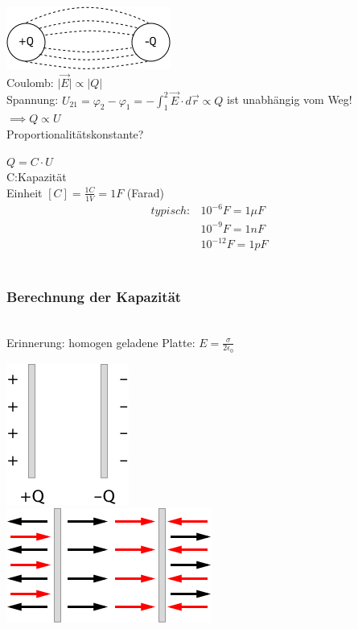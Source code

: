 \documentclass[11pt]{article}
\begin{document}
\includegraphics{skizzen/14/14_8B4}\\

Coulomb: $\vert\vec{E}\vert\propto\vert Q\vert$\\
Spannung: $ U_{21}=\varphi_2-\varphi_1 = -\displaystyle\int_{1}^{2} \vec{E}\cdot d\vec{r}\propto Q $ ist unabhängig vom Weg!\\

$ \implies Q\propto U $\\

Proportionalitätskonstante?

$\boxed{Q=C\cdot U}$\\

C:Kapazität\\
Einheit $[C]=\frac{1C}{1V}=1F$ (Farad)\\

\begin{align*}
	typisch:& 10^{-6}F=1\mu F\\
	& 10^{-9}F=1nF\\
	& 10^{-12}F=1pF
\end{align*}\\

\subsubsection{Berechnung der Kapazität}
\hfill\\
Erinnerung: homogen geladene Platte: $E=\frac{\sigma}{2\epsilon_0}$

\begin{center}
	\includegraphics{skizzen/14/14_8B5}\\

\includegraphics{skizzen/14/14_8B6}\\
\end{center}
\end{document}
